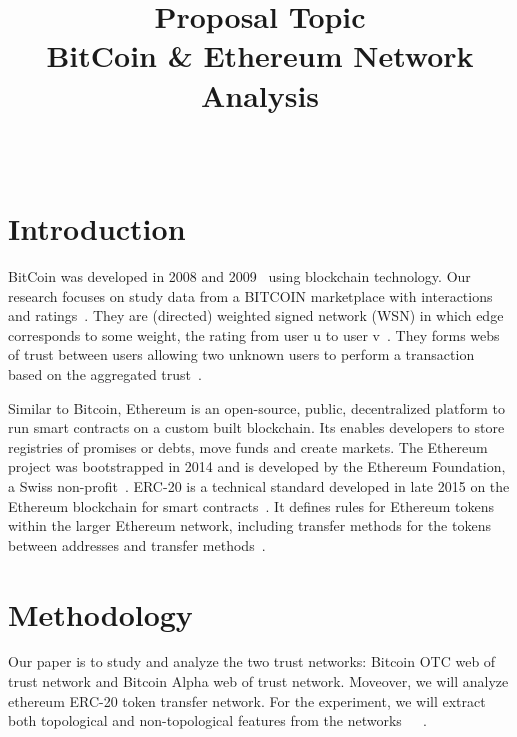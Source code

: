 \documentclass[onecolumn, 12pt]{IEEEtran}
\begin{document}
\title{Proposal Topic \\
BitCoin \& Ethereum Network Analysis
}

\author{\\
}
\maketitle
\section{Introduction}
BitCoin was developed in 2008 and 2009~\cite{nakamoto2008bitcoin} using blockchain technology.
Our research focuses on study data from a BITCOIN marketplace with interactions and ratings~\cite{aw2018analyzing}.
They are (directed) weighted signed network (WSN) in which edge corresponds to some weight, the rating from user u to user v~\cite{moindrot2017trust}.
They forms webs of trust between users allowing two unknown users to perform a transaction based on the aggregated trust~\cite{moindrot2017trust}.

Similar to Bitcoin, Ethereum is an open-source, public, decentralized platform to run smart contracts on a custom built blockchain. Its enables developers to store registries of promises or debts, move funds and create markets. The Ethereum project was bootstrapped in 2014 and is developed by the Ethereum Foundation, a Swiss non-profit~\cite{ethereum}. ERC-20 is a technical standard developed in late 2015 on the Ethereum blockchain for smart contracts~\cite{erc20}. It defines rules for Ethereum tokens within the larger Ethereum network, including transfer methods for the tokens between addresses and transfer methods~\cite{erc20}.
\section{Methodology}
Our paper is to study and analyze the two trust networks: Bitcoin OTC web of trust network and Bitcoin Alpha web of trust network. Moveover, we will analyze ethereum ERC-20 token transfer network.
For the experiment, we will extract both topological and non-topological features from the networks~\cite{liben2007link}~\cite{al2006link}~\cite{davis2011multi}.
\end{document}
